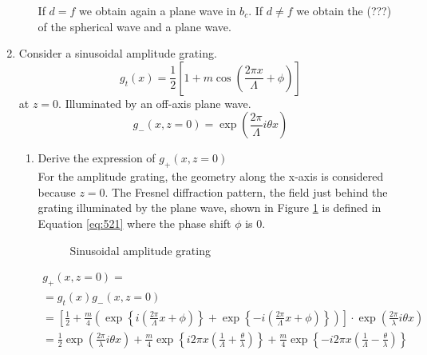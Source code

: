 \documentclass[main.tex]{subfiles}
\begin{document}
\begin{enumerate}
\begin{enumerate}
If $d=f$ we obtain again a plane wave in $b_c$. If $d \neq f$ we obtain the (???) of the spherical wave and a plane wave.

\end{enumerate}

\item{Consider a sinusoidal amplitude grating.}
$$g_t(x)=\frac{1}{2}\left[ 1+m\cos(\frac{2\pi x}{\Lambda} + \phi) \right]$$
at $z=0$. Illuminated by an off-axis plane wave.
$$g_{-}(x,z=0)=\exp(\frac{2\pi}{\Lambda}i \theta x)$$
\begin{enumerate}

\item{Derive the expression of $g_{\text{+}}(x,z=0)$}\\

For the amplitude grating, the geometry along the x-axis is considered because $z=0$. The Fresnel diffraction pattern, the field just behind the grating illuminated by the plane wave, shown in Figure \ref{fig:521} is defined in  Equation \ref{eq:521} where the phase shift $\phi$ is 0.

\begin{figure}
\centering{}
\caption{Sinusoidal amplitude grating}
\label{fig:521}
\end{figure}

\begin{equation}\label{eq:521}
\begin{split}
g_{+}(x, z=0) = \\
= g_{t}(x) g_{-}(x, z=0) \\
= \left [ \frac{1}{2} + \frac{m}{4} \left( \exp\left\{i \left( \frac{2\pi}{\Lambda}x + \phi \right) \right\} + \exp\left\{-i \left( \frac{2\pi}{\Lambda}x + \phi \right) \right\} \right) \right ] \cdot \exp \left( \frac{2\pi}{\lambda}i \theta x \right)\\
= \frac{1}{2} \exp \left( \frac{2\pi}{\lambda}i \theta x \right) + \frac{m}{4} \exp \left\{ i 2 \pi x \left(\frac{1}{\Lambda} + \frac{\theta}{\lambda} \right) \right\} + \frac{m}{4} \exp \left\{ -i 2 \pi x \left(\frac{1}{\Lambda} - \frac{\theta}{\lambda} \right) \right\}
\end{split}
\end{equation}


\end{enumerate}
\end{enumerate}
\end{document}
